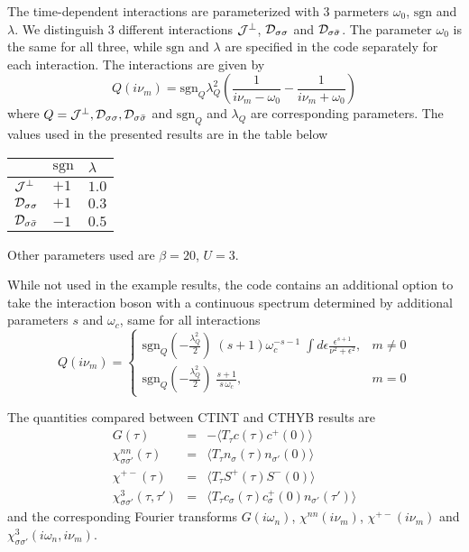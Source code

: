 \documentclass[a4paper,10pt]{article}
\begin{document}
The time-dependent interactions are parameterized with 3 parmeters $\omega_0$, $\mathrm{sgn}$ and $\lambda$. We distinguish 3 different interactions ${\cal J}^\perp$, ${\cal D}_{\sigma\sigma}$ and ${\cal D}_{\sigma\bar\sigma}$. The parameter $\omega_0$ is the same for all three, while $\mathrm{sgn}$ and $\lambda$ are specified in the code separately for each interaction. The interactions are given by
\begin{equation}\label{discrete}
 Q(i\nu_m) = \mathrm{sgn}_Q \lambda_Q^2 \left( \frac{1}{i\nu_m-\omega_0} - \frac{1}{i\nu_m+\omega_0}\right)
\end{equation}
where $Q = {\cal J}^\perp, {\cal D}_{\sigma\sigma},{\cal D}_{\sigma\bar\sigma}$ and $\mathrm{sgn}_Q$ and $\lambda_Q$ are corresponding parameters.
The values used in the presented results are in the table below
\begin{center}
    \begin{tabular}{| l | l | l |}
    \hline
     & $\mathrm{sgn}$ & $\lambda$  \\ \hline
    ${\cal J}^\perp$ & $+1$ & $1.0$ \\ \hline
    ${\cal D}_{\sigma\sigma}$ & $+1$ & $0.3$  \\ \hline
    ${\cal D}_{\sigma\bar\sigma}$ & $-1$ & $0.5$ \\
    \hline
    \end{tabular}
\end{center}
Other parameters used are $\beta=20$, $U=3$.

While not used in the example results, the code contains an additional option to take the interaction boson with a continuous spectrum determined by additional parameters $s$ and $\omega_c$, same for all interactions
\begin{equation} \label{continuous}
 Q(i\nu_m) = \left\{ \begin{array}{cc}
                       \mathrm{sgn}_Q \left(-\frac{\lambda_Q^2}{2}\right)\;(s+1)\omega_c^{-s-1}\;\int d\epsilon \frac{\epsilon^{s+1}}{\nu^2+\epsilon^2}, & m\neq 0 \\
                       \mathrm{sgn}_Q \left(-\frac{\lambda_Q^2}{2}\right)\;\frac{s+1}{s\,\omega_c}, & m= 0
                     \end{array} \right.
\end{equation}

The quantities compared between CTINT and CTHYB results are
\begin{eqnarray}
 G(\tau) &=& -\langle T_\tau c(\tau) c^+(0) \rangle \\ 
 \chi^{nn}_{\sigma\sigma'}(\tau) &=& \langle T_\tau n_\sigma(\tau) n_{\sigma'}(0) \rangle \\
 \chi^{+-}(\tau) &=& \langle T_\tau S^+(\tau) S^-(0) \rangle \\
 \chi^3_{\sigma\sigma'}(\tau,\tau') &=& \langle T_\tau c_\sigma(\tau) c^+_\sigma(0) n_{\sigma'}(\tau') \rangle
\end{eqnarray}
and the corresponding Fourier transforms $G(i\omega_n)$, $\chi^{nn}(i\nu_m)$, $\chi^{+-}(i\nu_m)$ and $\chi^3_{\sigma\sigma'}(i\omega_n,i\nu_m)$.
\end{document}
